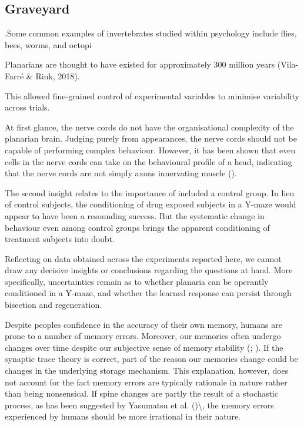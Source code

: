 \documentclass[
  jou,
  floatsintext,
  longtable,
  nolmodern,
  notxfonts,
  notimes,
  donotrepeattitle,
  colorlinks=true,linkcolor=blue,citecolor=blue,urlcolor=blue]{apa7}
\begin{document}
\subsection{Graveyard}\label{graveyard}

.Some common examples of invertebrates studied within psychology include
flies, bees, worms, and octopi

Planarians are thought to have existed for approximately 300 million
years (Vila-Farré \& Rink, 2018).

This allowed fine-grained control of experimental variables to minimise
variability across trials.

At first glance, the nerve cords do not have the organisational
complexity of the planarian brain. Judging purely from appearances, the
nerve cords should not be capable of performing complex behaviour.
However, it has been shown that even cells in the nerve cords can take
on the behavioural profile of a head, indicating that the nerve cords
are not simply axons innervating muscle
().

The second insight relates to the importance of included a control
group. In lieu of control subjects, the conditioning of drug exposed
subjects in a Y-maze would appear to have been a resounding success. But
the systematic change in behaviour even among control groups brings the
apparent conditioning of treatment subjects into doubt.

Reflecting on data obtained across the experiments reported here, we
cannot draw any decisive insights or conclusions regarding the questions
at hand. More specifically, uncertainties remain as to whether planaria
can be operantly conditioned in a Y-maze, and whether the learned
response can persist through bisection and regeneration.

Despite peoples confidence in the accuracy of their own memory, humans
are prone to a number of memory errors. Moreover, our memories often
undergo changes over time despite our subjective sense of memory
stability (;
). If the
synaptic trace theory is correct, part of the reason our memories change
could be changes in the underlying storage mechanism. This explanation,
however, does not account for the fact memory errors are typically
rationale in nature rather than being nonsensical. If spine changes are
partly the result of a stochastic process, as has been suggested by
Yasumatsu et al.
()\textbackslash, the
memory errors experienced by humans should be more irrational in their
nature.
\end{document}
